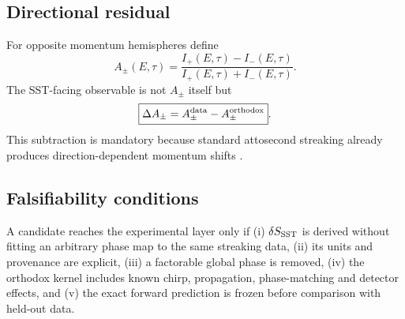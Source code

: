 \subsection{Directional residual}
For opposite momentum hemispheres define
\begin{equation}
A_{\pm}(E,\tau)=
\frac{I_+(E,\tau)-I_-(E,\tau)}
{I_+(E,\tau)+I_-(E,\tau)}.
\end{equation}
The SST-facing observable is not \(A_{\pm}\) itself but
\begin{equation}
\boxed{
\Delta A_{\pm}
=A_{\pm}^{\rm data}-A_{\pm}^{\rm orthodox}
}.
\end{equation}
This subtraction is mandatory because standard attosecond streaking already produces direction-dependent momentum shifts \cite{Gao2026Attosecond}.

\subsection{Falsifiability conditions}
A candidate reaches the experimental layer only if (i) \(\delta S_{\rm SST}\) is derived without fitting an arbitrary phase map to the same streaking data, (ii) its units and provenance are explicit, (iii) a factorable global phase is removed, (iv) the orthodox kernel includes known chirp, propagation, phase-matching and detector effects, and (v) the exact forward prediction is frozen before comparison with held-out data.
